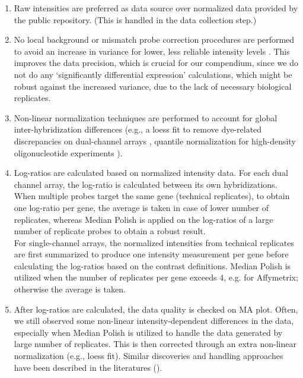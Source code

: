 \begin{enumerate}
\item Raw intensities are preferred as data source over normalized data
  provided by the public repository. (This is handled in the data collection
  step.)
%
\item No local background or mismatch probe correction procedures are
  performed to avoid an increase in variance for lower, less reliable
  intensity levels \cite{Ritchie2007, Irizarry2006, Engelen2006, Li2001}.
  This improves the data precision, which is crucial for our compendium, since
  we do not do any `significantly differential expression' calculations, which
  might be robust against the increased variance, due to the lack of necessary
  biological replicates.
%
\item Non-linear normalization techniques are performed to account for global
  inter-hybridization differences (e.g., a loess fit to remove dye-related
  discrepancies on dual-channel arrays \cite{Yang2002}, quantile normalization
  for high-density oligonucleotide experiments \cite{Bolstad2003}).
%
\item Log-ratios are calculated based on normalized intensity data.
  For each dual channel array, the log-ratio is calculated between its
  own hybridizations.  When multiple probes target the same gene
  (technical replicates), to obtain one log-ratio per gene, the
  average is taken in case of lower number of replicates, whereas
  Median Polish is applied on the log-ratios of a large number of
  replicate probes to obtain a robust result. \vspace{1.5mm} \\
  For single-channel arrays, the normalized intensities from technical
  replicates are first summarized to produce one intensity measurement
  per gene before calculating the log-ratios based on the contrast
  definitions.  Median Polish is utilized when the number of
  replicates per gene exceeds 4, e.g. for Affymetrix; otherwise the
  average is taken.
%
\item After log-ratios are calculated, the data quality is checked on MA plot.
  Often, we still observed some non-linear intensity-dependent differences in
  the data, especially when Median Polish is utilized to handle the data
  generated by large number of replicates.  This is then corrected through an
  extra non-linear normalization (e.g., loess fit).  Similar discoveries and
  handling approaches have been described in the literatures (\cite{Choe2005,
    Welsh2013}).
\end{enumerate}

